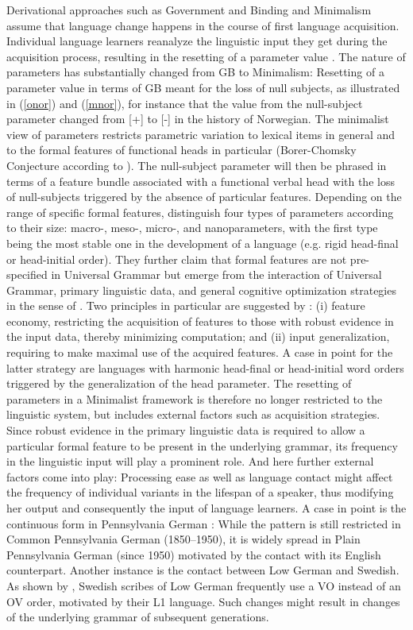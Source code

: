 \documentclass[output=paper]{langsci/langscibook}
\begin{document}
Derivational approaches such as Government and Binding and Minimalism assume that language change happens in the course of first language acquisition. Individual language learners reanalyze the linguistic input they get during the acquisition process, resulting in the resetting of a parameter value \citep{lightfoot1979}. The nature of parameters has substantially changed from GB to Minimalism: Resetting of a parameter value in terms of GB meant for the loss of null subjects, as illustrated in (\ref{onor}) and (\ref{mnor}), for instance that the value from the null-subject parameter changed from [+] to [-] in the history of Norwegian. The minimalist view of parameters restricts parametric variation to lexical items in general and to the formal features of functional heads in particular (Borer-Chomsky Conjecture according to \cite{baker2008}). The null-subject parameter will then be phrased in terms of a feature bundle associated with a functional verbal head with the loss of null-subjects triggered by the absence of particular features. Depending on the range of specific formal features, \cite{BiRo2017} distinguish four types of parameters according to their size: macro-, meso-, micro-, and nanoparameters, with the first type being the most stable one in the development of a language (e.g. rigid head-final or head-initial order). They further claim that formal features are not pre-specified in Universal Grammar but emerge from the interaction of Universal Grammar, primary linguistic data, and general cognitive optimization strategies in the sense of \cite{chomsky2005}. Two principles in particular are suggested by \cite{BiRo2017}: (i) feature economy, restricting the acquisition of features to those with robust evidence in the input data, thereby minimizing computation; and (ii) input generalization, requiring to make maximal use of the acquired features. A case in point for the latter strategy are languages with harmonic head-final or head-initial word orders triggered by the generalization of the head parameter. The resetting of parameters in a Minimalist framework is therefore no longer restricted to the linguistic system, but includes external factors such as acquisition strategies. Since robust evidence in the primary linguistic data is required to allow a particular formal feature to be present in the underlying grammar, its frequency in the linguistic input will play a prominent role. And here further external factors come into play: Processing ease as well as language contact might affect the frequency of individual variants in the lifespan of a speaker, thus modifying her output and consequently the input of language learners. A case in point is the continuous form in Pennsylvania German \citep{louden1988}: While the pattern is still restricted in Common Pennsylvania German (1850--1950), it is widely spread in Plain Pennsylvania German (since 1950) motivated by the contact with its English counterpart. Another instance is the contact between Low German and Swedish. As shown by \cite{petzell2016}, Swedish scribes of Low German frequently use a VO instead of an OV order, motivated by their L1 language. Such changes might result in changes of the underlying grammar of subsequent generations.     
\end{document}
